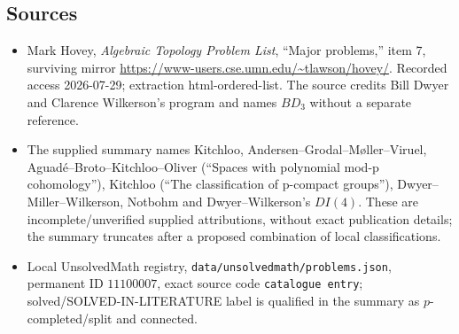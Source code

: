 \documentclass[11pt]{article}
\begin{document}
\subsection{Sources}
\begin{itemize}
\item Mark Hovey, \emph{Algebraic Topology Problem List}, ``Major problems,'' item 7, surviving mirror \url{https://www-users.cse.umn.edu/~tlawson/hovey/}. Recorded access 2026-07-29; extraction html-ordered-list. The source credits Bill Dwyer and Clarence Wilkerson's program and names \(BD_3\) without a separate reference.
\item The supplied summary names Kitchloo, Andersen--Grodal--M\o ller--Viruel, Aguad\'e--Broto--Kitchloo--Oliver (``Spaces with polynomial mod-p cohomology''), Kitchloo (``The classification of p-compact groups''), Dwyer--Miller--Wilkerson, Notbohm and Dwyer--Wilkerson's \(DI(4)\). These are incomplete/unverified supplied attributions, without exact publication details; the summary truncates after a proposed combination of local classifications.
\item Local UnsolvedMath registry, \texttt{data/unsolvedmath/problems.json}, permanent ID \(11100007\), exact source code \texttt{catalogue entry}; solved/SOLVED-IN-LITERATURE label is qualified in the summary as \(p\)-completed/split and connected.
\end{itemize}
\end{document}
